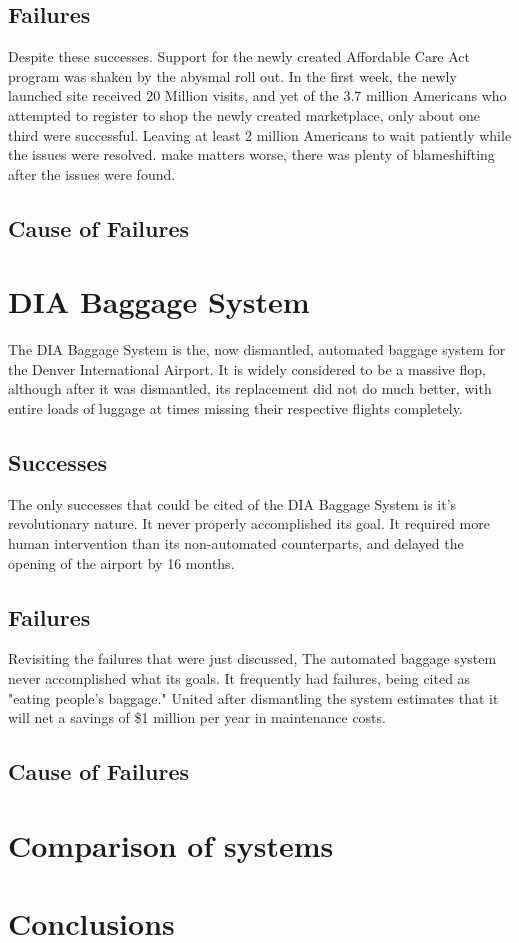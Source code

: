 \documentclass[conference]{IEEEtran}
\begin{document}
	\subsection{Failures}
	Despite these successes. Support for the newly created Affordable Care Act program was shaken by the abysmal roll out. In the first week, the newly launched site received 20 Million visits, and yet of the 3.7 million Americans who attempted to register to shop the newly created marketplace, only about one third were successful. Leaving at least 2 million Americans to wait patiently while the issues were resolved. \cite{hc_informationweek}  make matters worse, there was plenty of blameshifting after the issues were found. 
	\subsection{Cause of Failures}

\section{DIA Baggage System}
	The DIA Baggage System is the, now dismantled, automated baggage system for the Denver International Airport. It is widely considered to be a massive flop, although after it was dismantled, its replacement did not do much better, with entire loads of luggage at times missing their respective flights completely. \cite{dia_denverpost} 
	\subsection{Successes}
	The only successes that could be cited of the DIA Baggage System is it's revolutionary nature. It never properly accomplished its goal. It required more human intervention than its non-automated counterparts, and delayed the opening of the airport by 16 months.
	\subsection{Failures}
	Revisiting the failures that were just discussed, The automated baggage system never accomplished what its goals. It frequently had failures, being cited as "eating people's baggage."\cite{dia_calleam} United after dismantling the system estimates that it will net a savings of \$1 million per year in maintenance costs.\cite{dia_nbc} 
	\subsection{Cause of Failures}

\section{Comparison of systems}

\section{Conclusions}



\end{document}
